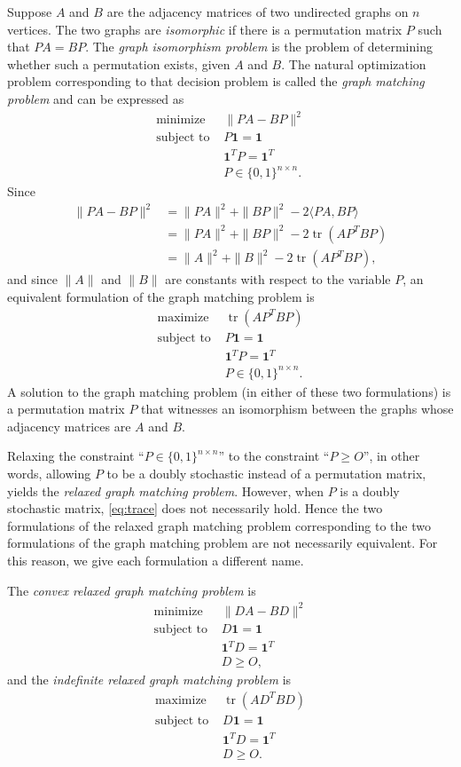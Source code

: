 \documentclass{article}
\newcommand{\1}{\mathbf{1}}
\DeclareMathOperator{\tr}{tr}
\begin{document}
Suppose $A$ and $B$ are the adjacency matrices of two undirected graphs on $n$ vertices.
The two graphs are \emph{isomorphic} if there is a permutation matrix $P$ such that $PA = BP$.
The \emph{graph isomorphism problem} is the problem of determining whether such a permutation exists, given $A$ and $B$.
The natural optimization problem corresponding to that decision problem is called the \emph{graph matching problem} and can be expressed as
\begin{align*}
  \text{minimize } & \|PA - BP\|^2 \\
  \text{subject to } & P \1 = \1 \\
  & \1^T P = \1^T \\
  & P \in \{0, 1\}^{n \times n}.
\end{align*}
Since
\begin{align}\label{eq:trace}
  \|PA - BP\|^2 & = \|PA\|^2 + \|BP\|^2 - 2 \langle PA, BP \rangle \nonumber \\
  & = \|PA\|^2 + \|BP\|^2 - 2 \tr(AP^TBP) \nonumber \\
  & = \|A\|^2 + \|B\|^2 - 2 \tr(AP^TBP),
\end{align}
and since $\|A\|$ and $\|B\|$ are constants with respect to the variable $P$, an equivalent formulation of the graph matching problem is
\begin{align*}
  \text{maximize } & \tr(AP^TBP) \\
  \text{subject to } & P \1 = \1 \\
  & \1^T P = \1^T \\
  & P \in \{0, 1\}^{n \times n}.
\end{align*}
A solution to the graph matching problem (in either of these two formulations) is a permutation matrix $P$ that witnesses an isomorphism between the graphs whose adjacency matrices are $A$ and $B$.

Relaxing the constraint ``$P \in \{0, 1\}^{n \times n}$'' to the constraint ``$P \geq O$'', in other words, allowing $P$ to be a doubly stochastic instead of a permutation matrix, yields the \emph{relaxed graph matching problem}.
However, when $P$ is a doubly stochastic matrix, \autoref{eq:trace} does not necessarily hold.
Hence the two formulations of the relaxed graph matching problem corresponding to the two formulations of the graph matching problem are not necessarily equivalent.
For this reason, we give each formulation a different name.

The \emph{convex relaxed graph matching problem} is
\begin{align*}
  \text{minimize } & \|DA - BD\|^2 \\
  \text{subject to } & D \1 = \1 \\
  & \1^T D = \1^T \\
  & D \geq O,
\end{align*}
and the \emph{indefinite relaxed graph matching problem} is
\begin{align*}
  \text{maximize } & \tr(AD^TBD) \\
  \text{subject to } & D \1 = \1 \\
  & \1^T D = \1^T \\
  & D \geq O.
\end{align*}
\end{document}
